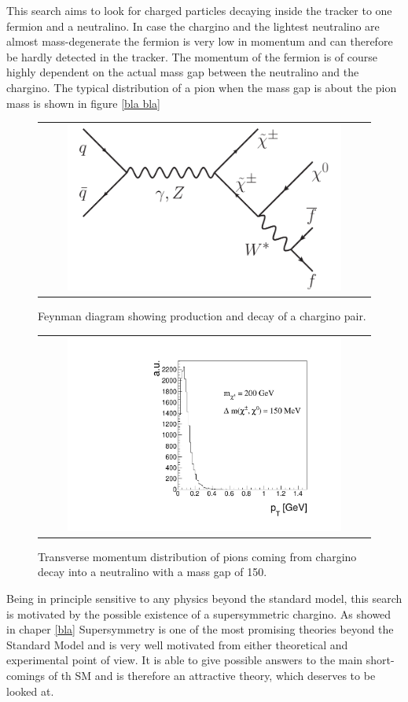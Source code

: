 This search aims to look for charged particles decaying inside the tracker to one fermion and a neutralino. 
In case the chargino and the lightest neutralino are almost mass-degenerate the fermion is very low in momentum and can therefore be hardly detected in the tracker. 
The momentum of the fermion is of course highly dependent on the actual mass gap between the neutralino and the chargino. 
The typical \pt distribution of a pion when the mass gap is about the pion mass is shown in figure \ref{bla bla}
\begin{figure}[!tp]
  \centering 
  \begin{tabular}{c}
    \includegraphics[width=0.85\textwidth]{figures/CharginoPairProductionDiagrams_Decay.pdf}
  \end{tabular}
  \caption{Feynman diagram showing production and decay of a chargino pair.}
  \label{fig:feynmanDiagram}
\end{figure}
\begin{figure}[!tp]
  \centering 
  \begin{tabular}{c}
    \includegraphics[width=0.85\textwidth]{figures/ptOfPions.pdf}
  \end{tabular}
  \caption{Transverse momentum distribution of pions coming from chargino decay into a neutralino with a mass gap of 150\mev.}
  \label{fig:ptOfPions}
\end{figure}
Being in principle sensitive to any physics beyond the standard model, this search is motivated by the possible existence of a supersymmetric chargino.
As showed in chaper \ref{bla} Supersymmetry is one of the most promising theories beyond the Standard Model and is very well motivated from either theoretical and experimental point of view. 
It is  able to give possible answers to the main short-comings of th SM and is therefore an attractive theory, which deserves to be looked at.

